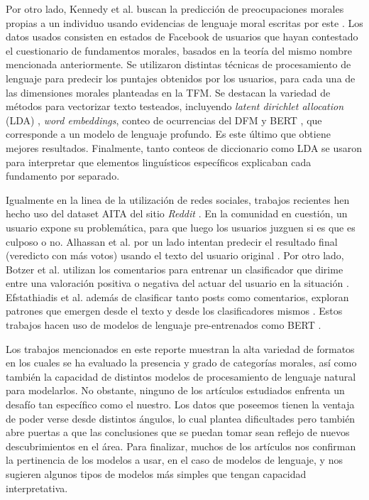 \documentclass[
	spanish, %
	letterpaper, oneside
]{article}
\begin{document}
\newp Por otro lado, Kennedy et al. buscan la predicción de preocupaciones morales propias a un individuo usando evidencias de lenguaje moral escritas por este \cite{diff}. Los datos usados consisten en estados de Facebook de usuarios que hayan contestado el cuestionario de fundamentos morales, basados en la teoría del mismo nombre mencionada anteriormente. Se utilizaron distintas técnicas de procesamiento de lenguaje para predecir los puntajes obtenidos por los usuarios, para cada una de las dimensiones morales planteadas en la TFM. Se destacan la variedad de métodos para vectorizar texto testeados, incluyendo \textit{latent dirichlet allocation} (LDA) \cite{lda}, \textit{word embeddings}, conteo de ocurrencias del DFM \cite{tfd} y BERT \cite{bert}, que corresponde a un modelo de lenguaje profundo. Es este último que obtiene mejores resultados. Finalmente, tanto conteos de diccionario como LDA se usaron para interpretar que elementos linguísticos específicos explicaban cada fundamento por separado.

\newp Igualmente en la linea de la utilización de redes sociales, trabajos recientes hen hecho uso del dataset AITA del sitio \textit{Reddit} \cite{aita}. En la comunidad en cuestión, un usuario expone su problemática, para que luego los usuarios juzguen si es que es culposo o no. Alhassan et al. por un lado intentan predecir el resultado final (veredicto con más votos) usando el texto del usuario original \cite{alh}. Por otro lado, Botzer et al. utilizan los comentarios para entrenar un clasificador que dirime entre una valoración positiva o negativa del actuar del usuario en la situación \cite{botzer}. Efstathiadis et al. además de clasificar tanto posts como comentarios, exploran patrones que emergen desde el texto y desde los clasificadores mismos \cite{Efs}. Estos trabajos hacen uso de modelos de lenguaje pre-entrenados como BERT \cite{bert}.



Los trabajos mencionados en este reporte muestran la alta variedad de formatos en los cuales se ha evaluado la presencia y grado de categorías morales, así como también la capacidad de distintos modelos de procesamiento de lenguaje natural para modelarlos. No obstante, ninguno de los artículos estudiados enfrenta un desafío tan específico como el nuestro. Los datos que poseemos tienen la ventaja de poder verse desde distintos ángulos, lo cual plantea dificultades pero también abre puertas a que las conclusiones que se puedan tomar sean reflejo de nuevos descubrimientos en el área. Para finalizar, muchos de los artículos nos confirman la pertinencia de los modelos a usar, en el caso de modelos de lenguaje, y nos sugieren algunos tipos de modelos más simples que tengan capacidad interpretativa.
\end{document}
